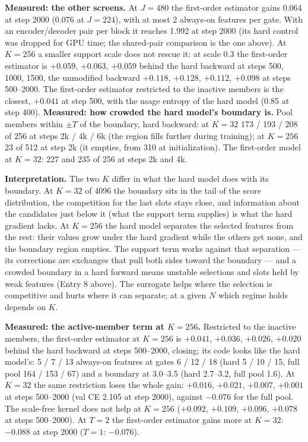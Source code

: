 \documentclass[11pt,a4paper]{article}
\begin{document}
\textbf{Measured: the other screens.}  At \(J=480\) the first-order estimator gains 0.064 at step 2000 (0.076 at
\(J=224\)), with at most 2 always-on features per gate.  With an encoder/decoder pair per block it reaches 1.992 at
step 2000 (its hard control was dropped for GPU time; the shared-pair comparison is the one above).  At \(K=256\) a
smaller support scale does not rescue it: at scale 0.3 the first-order estimator is \(+0.059\), \(+0.063\), \(+0.059\)
behind the hard backward at steps 500, 1000, 1500, the unmodified backward \(+0.118\), \(+0.128\), \(+0.112\), \(+0.098\)
at steps 500--2000.  The first-order estimator restricted to the inactive members is the closest, \(+0.041\) at step
500, with the usage entropy of the hard model (0.85 at step 400).
\textbf{Measured: how crowded the hard model's boundary is.}  Pool members within \(\pm T\) of the boundary, hard
backward: at \(K=32\) 173 / 193 / 208 of 256 at steps 2k / 4k / 6k (the region fills further during training); at
\(K=256\) 23 of 512 at step 2k (it empties, from 310 at initialization).  The first-order model at \(K=32\): 227 and
235 of 256 at steps 2k and 4k.

\textbf{Interpretation.}  The two \(K\) differ in what the hard model does with its boundary.  At \(K=32\) of 4096 the
boundary sits in the tail of the score distribution, the competition for the last slots stays close, and
information about the candidates just below it (what the support term supplies) is what the hard gradient lacks.
At \(K=256\) the hard model separates the selected features from the rest: their values grow under the hard
gradient while the others get none, and the boundary region empties.  The support term works against that
separation --- its corrections are exchanges that pull both sides toward the boundary --- and a crowded boundary
in a hard forward means unstable selections and slots held by weak features (Entry 8 above).  The surrogate helps
where the selection is competitive and hurts where it can separate; at a given \(N\) which regime holds depends on
\(K\).

\textbf{Measured: the active-member term at \(K=256\).}  Restricted to the inactive members, the first-order estimator
at \(K=256\) is \(+0.041\), \(+0.036\), \(+0.026\), \(+0.020\) behind the hard backward at steps 500--2000, closing; its code
looks like the hard model's: 5 / 7 / 13 always-on features at gates 6 / 12 / 18 (hard 5 / 10 / 15, full pool 164 /
153 / 67) and a boundary at 3.0--3.5 (hard 2.7--3.2, full pool 1.6).  At \(K=32\) the same restriction loses the whole gain: \(+0.016\),
\(+0.021\), \(+0.007\), \(+0.001\) at steps 500--2000 (val CE 2.105 at step 2000), against \(-0.076\) for the full pool.  The scale-free kernel does not help at
\(K=256\) (\(+0.092\), \(+0.109\), \(+0.096\), \(+0.078\) at steps 500--2000).  At \(T=2\) the first-order estimator gains more at
\(K=32\): \(-0.088\) at step 2000 (\(T=1\): \(-0.076\)).
\end{document}
